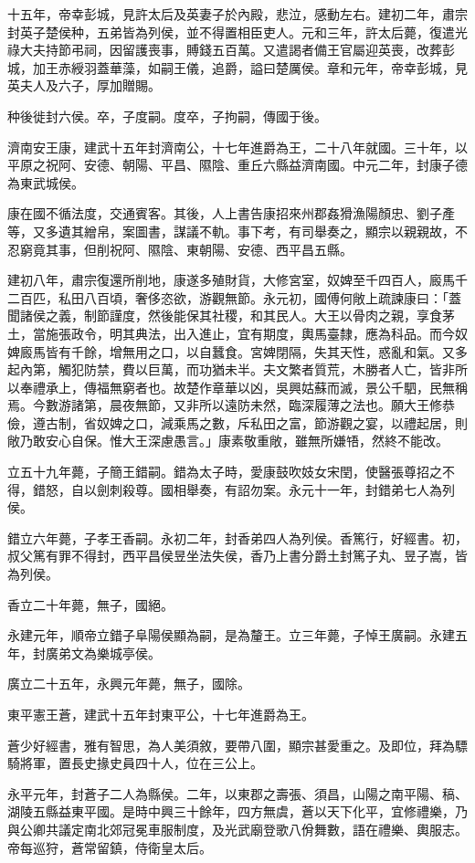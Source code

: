 \begin{pinyinscope}
十五年，帝幸彭城，見許太后及英妻子於內殿，悲泣，感動左右。建初二年，肅宗封英子楚侯种，五弟皆為列侯，並不得置相臣吏人。元和三年，許太后薨，復遣光祿大夫持節弔祠，因留護喪事，賻錢五百萬。又遣謁者備王官屬迎英喪，改葬彭城，加王赤綬羽蓋華藻，如嗣王儀，追爵，謚曰楚厲侯。章和元年，帝幸彭城，見英夫人及六子，厚加贈賜。

种後徙封六侯。卒，子度嗣。度卒，子拘嗣，傳國于後。

濟南安王康，建武十五年封濟南公，十七年進爵為王，二十八年就國。三十年，以平原之祝阿、安德、朝陽、平昌、隰陰、重丘六縣益濟南國。中元二年，封康子德為東武城侯。

康在國不循法度，交通賓客。其後，人上書告康招來州郡姦猾漁陽顏忠、劉子產等，又多遺其繒帛，案圖書，謀議不軌。事下考，有司舉奏之，顯宗以親親故，不忍窮竟其事，但削祝阿、隰陰、東朝陽、安德、西平昌五縣。

建初八年，肅宗復還所削地，康遂多殖財貨，大修宮室，奴婢至千四百人，廄馬千二百匹，私田八百頃，奢侈恣欲，游觀無節。永元初，國傅何敞上疏諫康曰：「蓋聞諸侯之義，制節謹度，然後能保其社稷，和其民人。大王以骨肉之親，享食茅土，當施張政令，明其典法，出入進止，宜有期度，輿馬臺隸，應為科品。而今奴婢廄馬皆有千餘，增無用之口，以自蠶食。宮婢閉隔，失其天性，惑亂和氣。又多起內第，觸犯防禁，費以巨萬，而功猶未半。夫文繁者質荒，木勝者人亡，皆非所以奉禮承上，傳福無窮者也。故楚作章華以凶，吳興姑蘇而滅，景公千駟，民無稱焉。今數游諸第，晨夜無節，又非所以遠防未然，臨深履薄之法也。願大王修恭儉，遵古制，省奴婢之口，減乘馬之數，斥私田之富，節游觀之宴，以禮起居，則敞乃敢安心自保。惟大王深慮愚言。」康素敬重敞，雖無所嫌啎，然終不能改。

立五十九年薨，子簡王錯嗣。錯為太子時，愛康鼓吹妓女宋閏，使醫張尊招之不得，錯怒，自以劍刺殺尊。國相舉奏，有詔勿案。永元十一年，封錯弟七人為列侯。

錯立六年薨，子孝王香嗣。永初二年，封香弟四人為列侯。香篤行，好經書。初，叔父篤有罪不得封，西平昌侯昱坐法失侯，香乃上書分爵土封篤子丸、昱子嵩，皆為列侯。

香立二十年薨，無子，國絕。

永建元年，順帝立錯子阜陽侯顯為嗣，是為釐王。立三年薨，子悼王廣嗣。永建五年，封廣弟文為樂城亭侯。

廣立二十五年，永興元年薨，無子，國除。

東平憲王蒼，建武十五年封東平公，十七年進爵為王。

蒼少好經書，雅有智思，為人美須敘，要帶八圍，顯宗甚愛重之。及即位，拜為驃騎將軍，置長史掾史員四十人，位在三公上。

永平元年，封蒼子二人為縣侯。二年，以東郡之壽張、須昌，山陽之南平陽、稿、湖陵五縣益東平國。是時中興三十餘年，四方無虞，蒼以天下化平，宜修禮樂，乃與公卿共議定南北郊冠冕車服制度，及光武廟登歌八佾舞數，語在禮樂、輿服志。帝每巡狩，蒼常留鎮，侍衛皇太后。


\end{pinyinscope}
